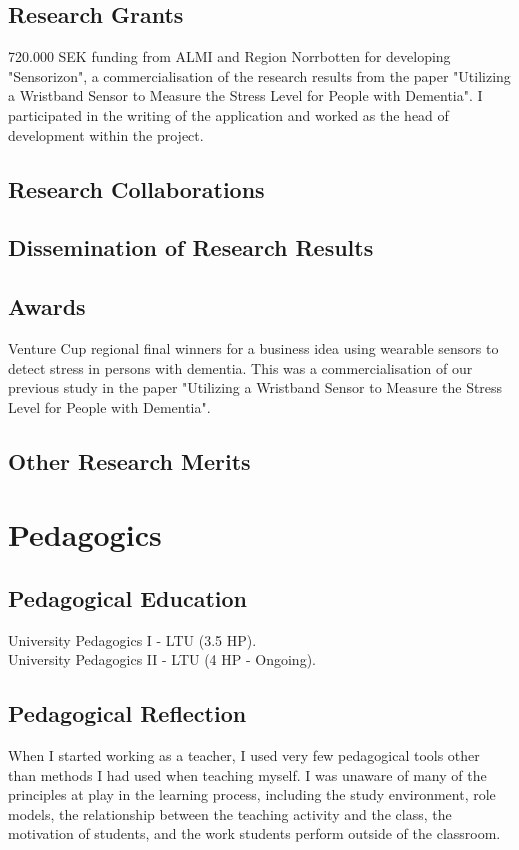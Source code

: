 \documentclass{article}
\begin{document}
\subsection{Research Grants}
720.000 SEK funding from ALMI and Region Norrbotten for developing "Sensorizon", a commercialisation of the research results from the paper "Utilizing a Wristband Sensor to Measure the Stress Level for People with Dementia". I participated in the writing of the application and worked as the head of development within the project.

\subsection{Research Collaborations}

\subsection{Dissemination of Research Results}

\subsection{Awards}
Venture Cup regional final winners for a business idea using wearable sensors to detect stress in persons with dementia. This was a commercialisation of our previous study in the paper "Utilizing a Wristband Sensor to Measure the Stress Level for People with Dementia".

\subsection{Other Research Merits}
\newpage


\section{Pedagogics}
\subsection{Pedagogical Education}
University Pedagogics I - LTU (3.5 HP).\\
University Pedagogics II - LTU (4 HP - Ongoing).

\subsection{Pedagogical Reflection}
When I started working as a teacher, I used very few pedagogical tools other than methods I had used when teaching myself. I was unaware of many of the principles at play in the learning process, including the study environment, role models, the relationship between the teaching activity and the class, the motivation of students, and the work students perform outside of the classroom.
\end{document}
